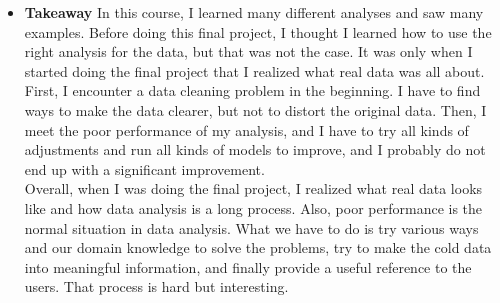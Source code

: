 \documentclass[11pt]{article} %
\begin{document}
\begin{itemize}
\item \textbf{Takeaway}
\newline
In this course, I learned many different analyses and saw many examples. Before doing this final project, I thought I learned how to use the right analysis for the data, but that was not the case. It was only when I started doing the final project that I realized what real data was all about. First, I encounter a data cleaning problem in the beginning. I have to find ways to make the data clearer, but not to distort the original data. Then, I meet the poor performance of my analysis, and I have to try all kinds of adjustments and run all kinds of models to improve, and I probably do not end up with a significant improvement.
\\
Overall, when I was doing the final project, I realized what real data looks like and how data analysis is a long process. Also, poor performance is the normal situation in data analysis. What we have to do is try various ways and our domain knowledge to solve the problems, try to make the cold data into meaningful information, and finally provide a useful reference to the users. That process is hard but interesting.

\end{itemize}
\end{document}
